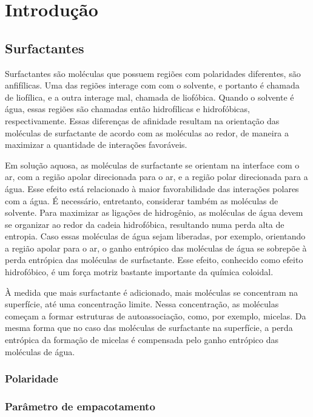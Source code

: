 \part{Introdução}
	\chapter{Surfactantes}
	
	Surfactantes são moléculas que possuem regiões com polaridades diferentes, são anfifílicas. Uma das regiões interage com com o solvente, e portanto é chamada de liofílica, e a outra interage mal, chamada de liofóbica. Quando o solvente é água, essas regiões são chamadas então hidrofílicas e hidrofóbicas, respectivamente. Essas diferenças de afinidade resultam na orientação das moléculas de surfactante de acordo com as moléculas ao redor, de maneira a maximizar a quantidade de interações favoráveis.
	
	Em solução aquosa, as moléculas de surfactante se orientam na interface com o ar, com a região apolar direcionada para o ar, e a região polar direcionada para a água. Esse efeito está relacionado à maior favorabilidade das interações polares com a água. É necessário, entretanto, considerar também as moléculas de solvente. Para maximizar as ligações de hidrogênio, as moléculas de água devem se organizar ao redor da cadeia hidrofóbica, resultando numa perda alta de entropia. Caso essas moléculas de água sejam liberadas, por exemplo, orientando a região apolar para o ar, o ganho entrópico das moléculas de água se sobrepõe à perda entrópica das moléculas de surfactante. Esse efeito, conhecido como efeito hidrofóbico, é um força motriz bastante importante da química coloidal.
	
	À medida que mais surfactante é adicionado, mais moléculas se concentram na superfície, até uma concentração limite. Nessa concentração, as moléculas começam a formar estruturas de autoassociação, como, por exemplo, micelas. Da mesma forma que no caso das moléculas de surfactante na superfície, a perda entrópica da formação de micelas é compensada pelo ganho entrópico das moléculas de água. 
	
	
		\section{Polaridade}
		\section{Parâmetro de empacotamento}
